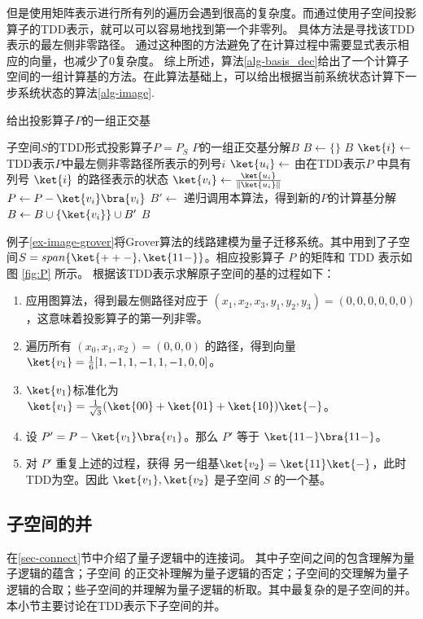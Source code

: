 但是使用矩阵表示进行所有列的遍历会遇到很高的复杂度。而通过使用子空间投影算子的TDD表示，就可以可以容易地找到第一个非零列。
具体方法是寻找该TDD表示的最左侧非零路径。
通过这种图的方法避免了在计算过程中需要显式表示相应的向量，也减少了0复杂度​​。
综上所述，算法\ref{alg-basis_dec}给出了一个计算子空间的一组计算基的方法。在此算法基础上，可以给出根据当前系统状态计算下一步系统状态的算法\ref{alg-image}.
\begin{algorithm}
\caption{给出投影算子$P$的一组正交基}
\label{alg-basis_dec} 
\begin{algorithmic}[1]
    \Require 子空间$S$的TDD形式投影算子$P=P_S$ 
    \Ensure $P$的一组正交基分解$B$
    \State $B\gets \{\}$
        \Return \(B\)
    \Else
        \State \(\ket{i} \gets\) TDD表示\(P\)中最左侧非零路径所表示的列号\(i\)
        \State \(\ket{u_i}\gets\) 由在TDD表示\(P\) 中具有列号 \(\ket{i}\) 的路径表示的状态
        \State \(\ket{v_i} \gets \frac{\ket{u_i}}{\|\ket{u_i}\|}\)
        \State \(P \gets P - \ket{v_i}\bra{v_i}\)
        \State \(B' \gets \) 递归调用本算法，得到新的$P$的计算基分解
        \State \(B \gets B \cup \{\ket{v_i}\} \cup B'\)
    \EndIf
    \State \Return \(B\)
\end{algorithmic}
\end{algorithm}

\begin{example}
    \label{ex-image-sub}
    例子\ref{ex-image-grover}将Grover算法的线路建模为量子迁移系统。其中用到了子空间$S=span\{\ket{++-},\ket{11-}\}$。相应投影算子 $P$ 的矩阵和 TDD 表示如图 \ref{fig:P} 所示。
    根据该TDD表示求解原子空间的基的过程如下：
    \begin{enumerate}
        \item 应用图算法，得到最左侧路径对应于 $(x_1,x_2,x_3,y_1,y_2,y_3)=(0,0,0,0,0,0)$，这意味着投影算子的第一列非零。
        \item 遍历所有 $(x_0,x_1,x_2)=(0,0,0)$ 的路径，得到向量 $\ket{v_1}=\frac{1}{6}[1,-1,1,-1,1,-1,0,0]$。
        \item $\ket{v_1}$标准化为 $\ket{v_1}=\frac{1}{\sqrt{3}}(\ket{00}+\ket{01}+\ket{10})\ket{-}$。
        \item 设 $P'=P-\ket{v_1}\bra{v_1}$。那么 $P'$ 等于 $\ket{11-}\bra{11-}$。
        \item 对 $P'$ 重复上述的过程，获得 另一组基$\ket{v_2}=\ket{11}\ket{-}$，此时TDD为空。因此 ${\ket{v_1},\ket{v_2}}$ 是子空间 $S$ 的一个基。
    \end{enumerate}
\end{example}
\subsection{子空间的并}
在\ref{sec-connect}节中介绍了量子逻辑中的连接词。
其中子空间之间的包含理解为量子逻辑的蕴含；子空间 的正交补理解为量子逻辑的否定；子空间的交理解为量子逻辑的合取；些子空间的并理解为量子逻辑的析取。其中最复杂的是子空间的并。本小节主要讨论在TDD表示下子空间的并。

